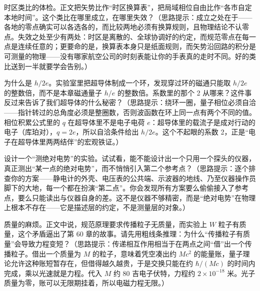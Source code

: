 \begin{puzzles}
\item 时区类比的体检。正文把矢势比作“时区换算表”，把局域相位自由比作“各市自定本地时间”。这个类比在哪里成立，在哪里失效？（思路提示：成立之处在于——各地的零点确实可以各选各的，而比较两地必须有换算规则，且物理结论不认零点。失效之处至少有两处：时区是离散的、全球协调好的约定，而规范零点在每一点是连续任意的；更要命的是，换算表本身只是纸面规则，而矢势沿回路的积分是可测量的物理——没有哪家航空公司的时刻表能让你的手表真的走时不同。好的类比送到一半就要学会告别。）
\item 为什么是 \(h/2e\)。实验室里把超导体制成一个环，发现穿过环的磁通只能取 \(h/2e\) 的整数倍，而不是本章磁通量子 \(h/e\) 的整数倍。系数里的那个 2 从哪来？这件事反过来告诉了我们超导体的什么秘密？（思路提示：绕环一圈，量子相位必须自洽——指针转过的总角度必须是整圈数，否则波函数在环上同一点有两个不同的值。相位积累公式里的 \(q\) 在超导体里不是电子电荷 \(e\)：超导体里的载流子是成对行动的电子（库珀对），\(q=2e\)，所以自洽条件给出 \(h/2e\)。这个不起眼的系数 2，正是“电子在超导体里两两结伴”的宏观铁证。）
\item 设计一个“测绝对电势”的实验。试试看，能不能设计出一个只用一个探头的仪器，真正测出“某一点的绝对电势”，而不悄悄引入第二个参考点？（思路提示：逐个排查你的方案——静电计的外壳、电压表的公共端、示波器的地线、乃至仪器操作员脚下的大地，每一个都在扮演“第二点”。你会发现所有方案要么偷偷接入了参考点，要么只能读出与仪器自身的差。这不是仪器不够精密，而是“绝对电势”在物理上根本不存在——它是描述层的约定，不是测量层的对象。）
\item 质量的麻烦。正文中说，规范原理要求传播粒子无质量，而实验上 \(W\) 粒子有质量，这个矛盾逼出了第 60 章的故事。请先用粗线条推理：为什么“传播粒子有质量”会导致力程变短？（思路提示：传递相互作用相当于在两点之间“借”出一个传播粒子。借出一个质量为 \(M\) 的粒子，意味着凭空凑出约 \(Mc^{2}\) 的能量账，量子理论允许这种账短暂存在，但借得越久越贵，于是交换只能在约 \(\hbar/(Mc)\) 的时间内完成，乘以光速就是力程。代入 \(M\) 约 80 吉电子伏特，力程约 \(2\times10^{-18}\) 米。光子质量为零，账可以无限期挂着，所以电磁力程无限。）
\end{puzzles}
